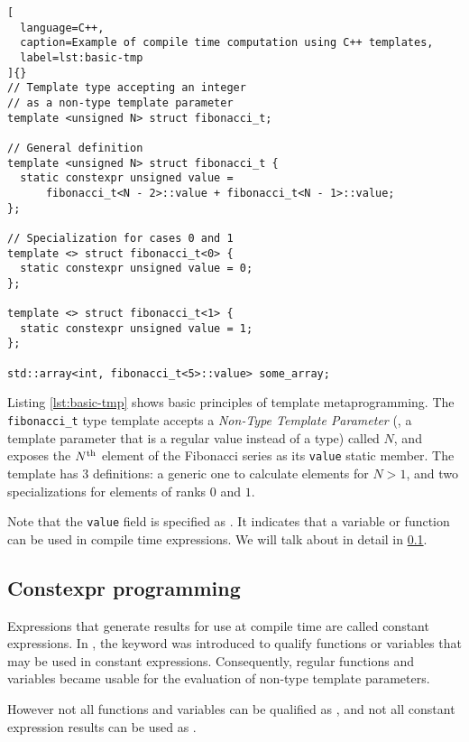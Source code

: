 \documentclass[../../main]{subfiles}
\begin{document}
\begin{lstlisting}[
  language=C++,
  caption=Example of compile time computation using C++ templates,
  label=lst:basic-tmp
]{}
// Template type accepting an integer
// as a non-type template parameter
template <unsigned N> struct fibonacci_t;

// General definition
template <unsigned N> struct fibonacci_t {
  static constexpr unsigned value =
      fibonacci_t<N - 2>::value + fibonacci_t<N - 1>::value;
};

// Specialization for cases 0 and 1
template <> struct fibonacci_t<0> {
  static constexpr unsigned value = 0;
};

template <> struct fibonacci_t<1> {
  static constexpr unsigned value = 1;
};

std::array<int, fibonacci_t<5>::value> some_array;
\end{lstlisting}

Listing \ref{lst:basic-tmp} shows basic principles of \cpp template
metaprogramming. The \lstinline{fibonacci_t} type template accepts a
\textit{Non-Type Template Parameter} (\nttp, \ie a template parameter that is
a regular value instead of a type) called $N$, and exposes the
$N\textsuperscript{th}$ element of the Fibonacci series as its
\lstinline{value} static member. The template has 3 definitions:
a generic one to calculate elements for $N > 1$,
and two specializations for elements of ranks $0$ and $1$.

Note that the \lstinline{value} field is specified as \constexpr.
It indicates that a variable or function can be used in compile time
expressions.
We will talk about \constexpr in detail in \ref{lbl:constexpr-programming}.

\subsection{
  Constexpr programming
}
\label{lbl:constexpr-programming}

Expressions that generate results for use at compile time are called
constant expressions. In , the \constexpr keyword was introduced
to qualify functions or variables that may be used in constant expressions.
Consequently, regular functions and variables became usable for the evaluation
of non-type template parameters.

However not all functions and variables can be qualified as \constexpr,
and not all constant expression results can be used as \nttps.
\\
\end{document}
